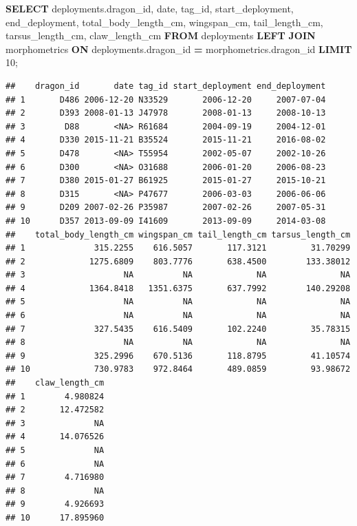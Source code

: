 \documentclass[
]{book}
\newenvironment{Shaded}{\begin{snugshade}}{\end{snugshade}}
\newcommand{\DataTypeTok}[1]{\textcolor[rgb]{0.13,0.29,0.53}{#1}}
\newcommand{\DecValTok}[1]{\textcolor[rgb]{0.00,0.00,0.81}{#1}}
\newcommand{\KeywordTok}[1]{\textcolor[rgb]{0.13,0.29,0.53}{\textbf{#1}}}
\newcommand{\NormalTok}[1]{#1}
\newcommand{\OperatorTok}[1]{\textcolor[rgb]{0.81,0.36,0.00}{\textbf{#1}}}
\begin{document}
\begin{Shaded}
\begin{Highlighting}[]
\KeywordTok{SELECT}\NormalTok{ deployments.dragon\_id, }\DataTypeTok{date}\NormalTok{, tag\_id, start\_deployment, end\_deployment,}
\NormalTok{total\_body\_length\_cm, wingspan\_cm, tail\_length\_cm, tarsus\_length\_cm, claw\_length\_cm}
\KeywordTok{FROM}\NormalTok{ deployments }
\KeywordTok{LEFT} \KeywordTok{JOIN}\NormalTok{ morphometrics }
\KeywordTok{ON}\NormalTok{ deployments.dragon\_id }\OperatorTok{=}\NormalTok{ morphometrics.dragon\_id }
\KeywordTok{LIMIT} \DecValTok{10}\NormalTok{;}
\end{Highlighting}
\end{Shaded}

\begin{verbatim}
##    dragon_id       date tag_id start_deployment end_deployment
## 1       D486 2006-12-20 N33529       2006-12-20     2007-07-04
## 2       D393 2008-01-13 J47978       2008-01-13     2008-10-13
## 3        D88       <NA> R61684       2004-09-19     2004-12-01
## 4       D330 2015-11-21 B35524       2015-11-21     2016-08-02
## 5       D478       <NA> T55954       2002-05-07     2002-10-26
## 6       D300       <NA> O31688       2006-01-20     2006-08-23
## 7       D380 2015-01-27 B61925       2015-01-27     2015-10-21
## 8       D315       <NA> P47677       2006-03-03     2006-06-06
## 9       D209 2007-02-26 P35987       2007-02-26     2007-05-31
## 10      D357 2013-09-09 I41609       2013-09-09     2014-03-08
##    total_body_length_cm wingspan_cm tail_length_cm tarsus_length_cm
## 1              315.2255    616.5057       117.3121         31.70299
## 2             1275.6809    803.7776       638.4500        133.38012
## 3                    NA          NA             NA               NA
## 4             1364.8418   1351.6375       637.7992        140.29208
## 5                    NA          NA             NA               NA
## 6                    NA          NA             NA               NA
## 7              327.5435    616.5409       102.2240         35.78315
## 8                    NA          NA             NA               NA
## 9              325.2996    670.5136       118.8795         41.10574
## 10             730.9783    972.8464       489.0859         93.98672
##    claw_length_cm
## 1        4.980824
## 2       12.472582
## 3              NA
## 4       14.076526
## 5              NA
## 6              NA
## 7        4.716980
## 8              NA
## 9        4.926693
## 10      17.895960
\end{verbatim}
\end{document}
